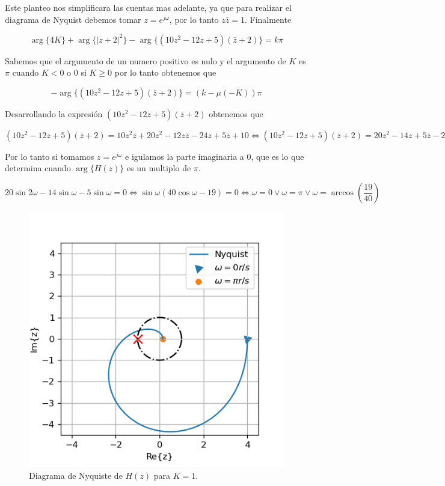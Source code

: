 \documentclass{article}
\begin{document}
        Este planteo nos simplificara las cuentas mas adelante, ya que para realizar el diagrama de Nyquist debemos tomar $z=e^{j\omega}$, por lo tanto 
        $z\bar{z}=1$. Finalmente 


        \begin{equation}
            \arg\{ 4K \} + \arg \{ |z+2|^2\} - \arg \{ (10z^2 - 12z +5)(\bar{z} + 2) \}= k\pi
        \end{equation}

        Sabemos que el argumento de un numero positivo es nulo y el argumento de $K$ es $\pi$ cuando $K<0$ o $0$ si $K\geq0$ por lo tanto obtenemos que 


        \begin{equation}
            - \arg \{ (10z^2 - 12z +5)(\bar{z} + 2) \} = ( k - \mu(-K) ) \pi
        \end{equation}

        Desarrollando la expresión $(10z^2 - 12z +5)(\bar{z} + 2)$ obtenemos que 

        \begin{equation}
            (10z^2 - 12z +5)(\bar{z} + 2) = 10z^2\bar{z} + 20z^2 -12z\bar{z} - 24z + 5\bar{z} + 10 \Leftrightarrow
            (10z^2 - 12z +5)(\bar{z} + 2) = 20z^2 - 14z + 5\bar{z} - 2
        \end{equation}

        Por lo tanto si tomamos $z=e^{j\omega}$ e igulamos la parte imaginaria a $0$, que es lo que determina cuando $\arg\{ H(z) \}$ es un 
        multiplo de $\pi$. 

        \begin{equation}
            20\sin{ 2\omega } - 14\sin{ \omega } - 5\sin{ \omega } = 0 \Leftrightarrow
            \sin{ \omega }( 40\cos{ \omega } - 19 ) = 0 \Leftrightarrow
            \omega = 0 \lor \omega = \pi \lor \omega = \arccos\left( \frac{19}{40} \right)
        \end{equation}

        \begin{figure}
            \centering
            \includegraphics[width=.5\textwidth]{Img/12-nyquist.png}
            \caption{Diagrama de Nyquiste de $H(z)$ para $K=1$.}
            \label{fig:12-nyquist}
        \end{figure}
\end{document}
